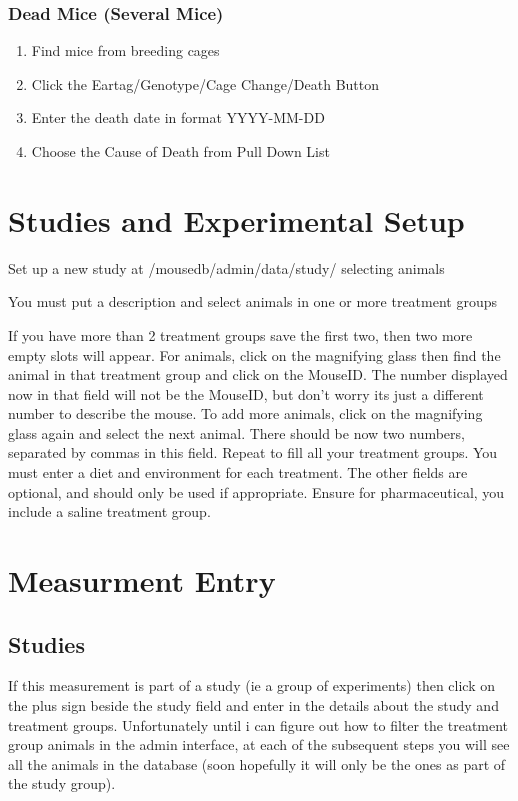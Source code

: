 \documentclass[letterpaper,10pt,english]{sphinxmanual}
\begin{document}
\subsection{Dead Mice (Several Mice)}
\begin{enumerate}
\item {} 
Find mice from breeding cages

\item {} 
Click the Eartag/Genotype/Cage Change/Death Button

\item {} 
Enter the death date in format YYYY-MM-DD

\item {} 
Choose the Cause of Death from Pull Down List

\end{enumerate}


\chapter{Studies and Experimental Setup}

Set up a new study at /mousedb/admin/data/study/ selecting animals

You must put a description and select animals in one or more treatment groups

If you have more than 2 treatment groups save the first two, then two more empty slots will appear. For animals, click on the magnifying glass then find the animal in that treatment group and click on the MouseID. The number displayed now in that field will not be the MouseID, but don't worry its just a different number to describe the mouse. To add more animals, click on the magnifying glass again and select the next animal. There should be now two numbers, separated by commas in this field. Repeat to fill all your treatment groups. You must enter a diet and environment for each treatment. The other fields are optional, and should only be used if appropriate. Ensure for pharmaceutical, you include a saline treatment group.


\chapter{Measurment Entry}


\section{Studies}

If this measurement is part of a study (ie a group of experiments) then click on the plus sign beside the study field and enter in the details about the study and treatment groups.  Unfortunately until i can figure out how to filter the treatment group animals in the admin interface, at each of the subsequent steps you will see all the animals in the database (soon hopefully it will only be the ones as part of the study group).
\end{document}
